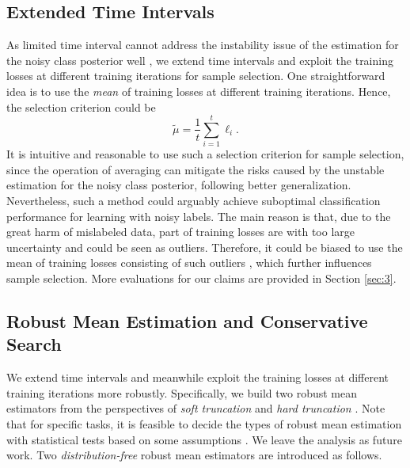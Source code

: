 \documentclass[11pt]{article}
\begin{document}
\subsection{Extended Time Intervals}\label{sec:2.2}
As limited time interval cannot address the instability issue of the estimation for the noisy class posterior well \citep{pleiss2020identifying}, we extend time intervals and exploit the training losses at different training iterations for sample selection. One straightforward idea is to use the \textit{mean} of training losses at different training iterations. Hence, the selection criterion could be 
\begin{equation}
    \tilde{\mu}=\frac{1}{t}\sum_{i=1}^t \ell_i.
\end{equation}
It is intuitive and reasonable to use such a selection criterion for sample selection, since the operation of averaging can mitigate the risks caused by the unstable estimation for the noisy class posterior, following better generalization. Nevertheless, such a method could arguably achieve suboptimal classification performance for learning with noisy labels. The main reason is that, due to the great harm of mislabeled data, part of training losses are with too large uncertainty and could be seen as outliers. Therefore, it could be biased to use the mean of training losses consisting of such outliers \citep{diakonikolas2020outlier}, which further influences sample selection. More evaluations for our claims are provided in Section \ref{sec:3}.
\subsection{Robust Mean Estimation and Conservative Search}\label{sec:2.3}
We extend time intervals and meanwhile exploit the training losses at different training iterations more robustly. Specifically, we build two robust mean estimators from the perspectives of \textit{soft truncation} and \textit{hard truncation} \citep{catoni2012challenging}. Note that for specific tasks, it is feasible to decide the types of robust mean estimation with statistical tests based on some assumptions \citep{chakrabarty2012understanding}. We leave the analysis as future work. Two \textit{distribution-free} robust mean estimators are introduced as follows.
\end{document}
